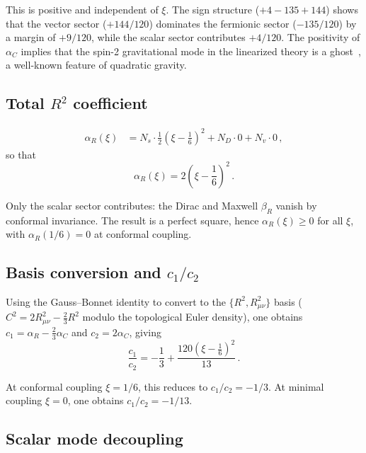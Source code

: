 \documentclass[aps,prd,twocolumn,superscriptaddress,nofootinbib,floatfix]{revtex4-2}
\begin{document}
This is positive and independent of $\xi$. The sign structure
($+4 - 135 + 144$) shows that the vector sector ($+144/120$) dominates the
fermionic sector ($-135/120$) by a margin of $+9/120$, while the scalar sector
contributes $+4/120$. The positivity of $\alpha_C$ implies that the spin-2
gravitational mode in the linearized theory is a ghost~\cite{Stelle:1976gc}, a
well-known feature of quadratic gravity.

\subsection{Total \texorpdfstring{$R^2$}{R2} coefficient}

\begin{align}
  \alpha_R(\xi) &= N_s \cdot \frac{1}{2}\!\left(\xi - \frac{1}{6}\right)^{\!2}
    + N_D \cdot 0 + N_v \cdot 0\,,
\end{align}
so that
\begin{equation}
  \boxed{\alpha_R(\xi) = 2\!\left(\xi - \frac{1}{6}\right)^{\!2}\,.}
  \label{eq:alphaR}
\end{equation}

Only the scalar sector contributes: the Dirac and Maxwell $\beta_R$ vanish by
conformal invariance. The result is a perfect square, hence
$\alpha_R(\xi) \geq 0$ for all $\xi$, with $\alpha_R(1/6) = 0$ at conformal
coupling.

\subsection{Basis conversion and \texorpdfstring{$c_1/c_2$}{c1/c2}}

Using the Gauss--Bonnet identity to convert to the $\{R^2, R_{\mu\nu}^2\}$
basis ($C^2 = 2R_{\mu\nu}^2 - \frac{2}{3}R^2$ modulo the topological Euler
density), one obtains $c_1 = \alpha_R - \frac{2}{3}\alpha_C$ and
$c_2 = 2\alpha_C$, giving
\begin{equation}
  \boxed{\frac{c_1}{c_2} = -\frac{1}{3}
    + \frac{120\!\left(\xi - \frac{1}{6}\right)^{\!2}}{13}\,.}
  \label{eq:c1c2}
\end{equation}

At conformal coupling $\xi = 1/6$, this reduces to $c_1/c_2 = -1/3$. At
minimal coupling $\xi = 0$, one obtains $c_1/c_2 = -1/13$.

\subsection{Scalar mode decoupling}
\end{document}
